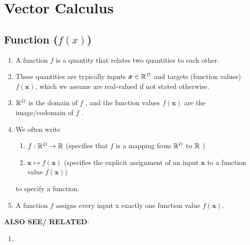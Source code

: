 \chapter{Vector Calculus}

\section{Function ($f(x)$)}

\begin{enumerate}
    \item A function $f$ is a quantity that relates two quantities to each other.
    \hfill \cite{mfml/book/mml/Deisenroth-Faisal-Ong}

    \item These quantities are typically inputs $\bm{x} \in \mathbb{R}^D$ and targets (function values) $f (\bm{x})$, which we assume are real-valued if not stated otherwise.
    \hfill \cite{mfml/book/mml/Deisenroth-Faisal-Ong}

    \item $\mathbb{R}^D$ is the domain of $f$ , and the function values $f (\bm{x})$ are the image/codomain of $f$ .
    \hfill \cite{mfml/book/mml/Deisenroth-Faisal-Ong}

    \item We often write
    \hfill \cite{mfml/book/mml/Deisenroth-Faisal-Ong}
    \begin{enumerate}
        \item $f: \mathbb{R}^D \to \mathbb{R}$
        (specifies that $f$ is a mapping from $\mathbb{R}^D$ to $\mathbb{R}$ )
        \hfill \cite{mfml/book/mml/Deisenroth-Faisal-Ong}

        \item $\bm{x} \mapsto f(\bm{x})$
        (specifies the explicit assignment of an input $\bm{x}$ to a function value $f(\bm{x})$)
        \hfill \cite{mfml/book/mml/Deisenroth-Faisal-Ong}
    \end{enumerate}
    to specify a function.
    \hfill \cite{mfml/book/mml/Deisenroth-Faisal-Ong}

    \item A function $f$ assigns every input x exactly one function value $f (\bm{x})$.
    \hfill \cite{mfml/book/mml/Deisenroth-Faisal-Ong}
\end{enumerate}

\vspace{0.5cm}
\textbf{ALSO SEE/ RELATED}:
\begin{enumerate}
    \item {}
\end{enumerate}



